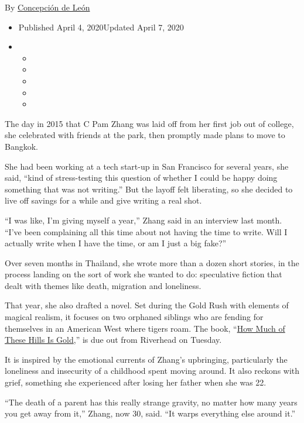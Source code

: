 By
\href{https://www.nytimes3xbfgragh.onion/by/concepcion-de-leon}{Concepción
de León}

\begin{itemize}
\item
  Published April 4, 2020Updated April 7, 2020
\item
  \begin{itemize}
  \item
  \item
  \item
  \item
  \item
  \end{itemize}
\end{itemize}

The day in 2015 that C Pam Zhang was laid off from her first job out of
college, she celebrated with friends at the park, then promptly made
plans to move to Bangkok.

She had been working at a tech start-up in San Francisco for several
years, she said, ``kind of stress-testing this question of whether I
could be happy doing something that was not writing.'' But the layoff
felt liberating, so she decided to live off savings for a while and give
writing a real shot.

``I was like, I'm giving myself a year,'' Zhang said in an interview
last month. ``I've been complaining all this time about not having the
time to write. Will I actually write when I have the time, or am I just
a big fake?''

Over seven months in Thailand, she wrote more than a dozen short
stories, in the process landing on the sort of work she wanted to do:
speculative fiction that dealt with themes like death, migration and
loneliness.

That year, she also drafted a novel. Set during the Gold Rush with
elements of magical realism, it focuses on two orphaned siblings who are
fending for themselves in an American West where tigers roam. The book,
``\href{https://www.nytimes3xbfgragh.onion/2020/04/07/books/review/how-much-of-these-hills-is-gold-c-pam-zhang.html}{How
Much of These Hills Is Gold},'' is due out from Riverhead on Tuesday.

It is inspired by the emotional currents of Zhang's upbringing,
particularly the loneliness and insecurity of a childhood spent moving
around. It also reckons with grief, something she experienced after
losing her father when she was 22.

``The death of a parent has this really strange gravity, no matter how
many years you get away from it,'' Zhang, now 30, said. ``It warps
everything else around it.''

